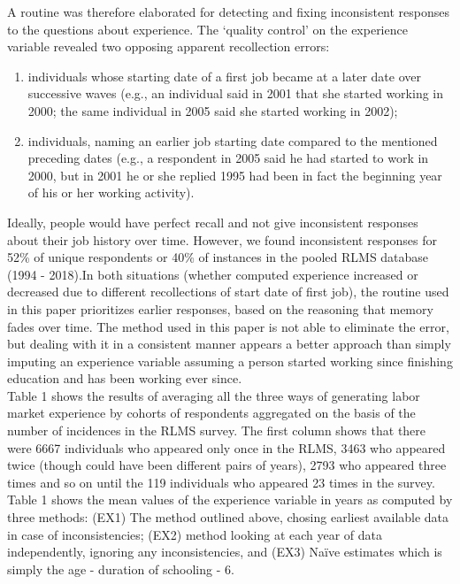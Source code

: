 \documentclass[12pt,a4paper]{article}
\begin{document}
A routine was therefore elaborated for detecting and fixing inconsistent responses to the questions about experience. The `quality control' on the experience variable revealed two opposing apparent recollection errors:

\begin{enumerate}
\item individuals whose starting date of a first job became at a later date over successive waves (e.g., an individual said in 2001 that she started working in 2000; the same individual in 2005 said she started working in 2002); 

\item individuals, naming an earlier job starting date compared to the mentioned preceding dates (e.g., a respondent in 2005 said he had started to work in 2000, but in 2001 he or she replied 1995 had been in fact the beginning year of his or her working activity). 
\end{enumerate}

Ideally, people would have perfect recall and not give inconsistent responses about their job history over time. However, we found inconsistent responses for 52\% of unique respondents or 40\% of instances in the pooled RLMS database (1994 - 2018).In both situations (whether computed experience increased or decreased due to different recollections of start date of first job), the  routine used in this paper prioritizes earlier responses, based on the reasoning that memory fades over time.  The method used in this paper is not able to eliminate the error, but dealing with it in a consistent manner appears a better approach than simply imputing an experience variable assuming a person started working since finishing education and has been working ever since.\\



Table 1 shows the results of averaging all the three ways of generating labor market experience by cohorts of respondents aggregated on the basis of the number of incidences in the RLMS survey. The first column shows that there were 6667 individuals who appeared only once in the RLMS, 3463 who appeared twice (though could have been different pairs of years), 2793 who appeared three times and so on until the 119 individuals who appeared 23 times in the survey. Table 1 shows the mean values of the experience variable in years as computed by three methods: (EX1) The method outlined above, chosing earliest available data in case of inconsistencies; (EX2) method looking at each year of data independently, ignoring any inconsistencies, and (EX3) Na\"ive estimates which is simply the age - duration of schooling - 6.\\
\end{document}
